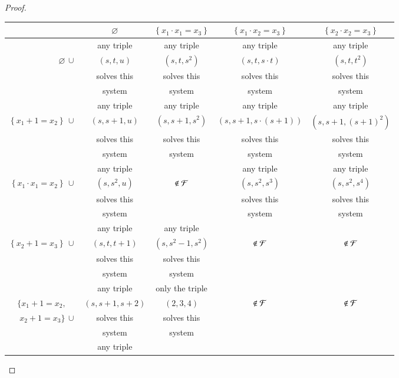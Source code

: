 \documentclass[conference]{IEEEtran}
\begin{document}
\begin{proof}
\begin{table}[ht!]
\setlength{\tabcolsep}{2.1pt}
\footnotesize
\centering
\begin{tabular}{|r|*{4}{c|}}
\cline{2-5}
\multicolumn{1}{c|}{$\phantom{\Bigg\vert}$} & $\varnothing$ & $\left\{x_1{\cdot}x_1{=}x_3\right\}$ & $\left\{x_1{\cdot}x_2{=}x_3\right\}$ & $\left\{x_2{\cdot}x_2{=}x_3\right\}$\\
 \hline
 & any triple & any triple & any triple & any triple \\
$\varnothing\, \cup$  & $\left(s,t,u\right)$ & $\left(s,t,s^2\right)$ & $\left(s,t,s{\cdot}t\right)$ & $\left(s,t,t^2\right)$\\
 & solves this	& solves this	& solves this	& solves this \\
 & system	& system	& system	& system \\
 \hline
 & any triple & any triple & any triple & any triple \\
$\left\{x_1{+}1{=}x_2\right\}\, \cup$  & $\left(s,s{+}1,u\right)$ & $\left(s,s{+}1,s^2\right)$ & $\left(s,s{+}1,s{\cdot}(s{+}1)\right)$ & $\left(s,s{+}1,(s{+}1)^2\right)$\\ 
 & solves this	& solves this	& solves this	& solves this \\
 & system	& system	& system	& system \\
 \hline
 & any triple &  	   & any triple & any triple \\
$\left\{x_1{\cdot}x_1{=}x_2\right\}\, \cup$  & $\left(s,s^2,u\right)$ & $\not\in {\cal F}$ & $\left(s,s^2,s^3\right)$ & $\left(s,s^2,s^4\right)$\\ 
 & solves this	&		& solves this	& solves this \\
 & system	&		& system	& system \\
 \hline
 & any triple & any triple &	& \\
$\left\{x_2{+}1{=}x_3\right\}\, \cup$  & $\left(s,t,t{+}1\right)$ & $\left(s,s^2{-}1,s^2\right)$ & $\not\in {\cal F}$ & $\not\in {\cal F}$\\ 
 & solves this	& solves this	&	& \\
 & system	& system	&	& \\
 \hline
 & any triple & only the triple &	& \\
$\{x_1{+}1{=}x_2,\phantom{\cup}$  & $\left(s,s{+}1,s{+}2\right)$ & $(2,3,4)$ & $\not\in {\cal F}$ & $\not\in {\cal F}$\\
$\phantom{\{}x_2{+}1{=}x_3\}\,\cup$ & solves this & solves this & & \\
 & system	& system	&	& \\
 \hline
 & any triple	&	&	& \\

\end{tabular}
\end{table}
\end{proof}
\end{document}
